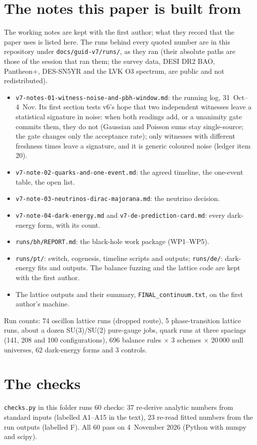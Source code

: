 \documentclass[11pt,a4paper]{article}
\begin{document}
\section{The notes this paper is built from}\label{app:notes}
The working notes are kept with the first author; what they record that the paper uses is listed here. The runs behind every
quoted number are in this repository under \texttt{docs/guid-v7/runs/}, as they ran (their absolute paths are those of the session that ran them;
the survey data, DESI DR2 BAO, Pantheon+, DES-SN5YR and the LVK O3 spectrum, are public and not redistributed).
\begin{itemize}[leftmargin=*,itemsep=1pt]
\item \texttt{v7-notes-01-witness-noise-and-pbh-window.md}: the running log, 31~Oct--4~Nov. Its first section tests v6's hope that two
independent witnesses leave a statistical signature in noise: when both readings add, or a unanimity gate commits them, they do not (Gaussian
and Poisson sums stay single-source; the gate changes only the acceptance rate); only witnesses with different freshness times leave a
signature, and it is generic coloured noise (ledger item 20).
\item \texttt{v7-note-02-quarks-and-one-event.md}: the agreed timeline, the one-event table, the open list.
\item \texttt{v7-note-03-neutrinos-dirac-majorana.md}: the neutrino decision.
\item \texttt{v7-note-04-dark-energy.md} and \texttt{v7-de-prediction-card.md}: every dark-energy form, with its count.
\item \texttt{runs/bh/REPORT.md}: the black-hole work package (WP1--WP5).
\item \texttt{runs/pt/}: switch, cogenesis, timeline scripts and outputs; \texttt{runs/de/}: dark-energy fits and outputs. The balance fuzzing
and the lattice code are kept with the first author.
\item The lattice outputs and their summary, \texttt{FINAL\_continuum.txt}, on the first author's machine.
\end{itemize}
Run counts: 74 oscillon lattice runs (dropped route), 5 phase-transition lattice runs, about a dozen SU(3)/SU(2) pure-gauge jobs, quark runs at three
spacings (141, 208 and 100 configurations), 696 balance rules $\times$ 3 schemes $\times$ 20\,000 null universes, 62 dark-energy forms and 3 controls.

\section{The checks}\label{app:checks}
\texttt{checks.py} in this folder runs 60 checks: 37 re-derive analytic numbers from standard inputs (labelled A1--A15 in the text), 23 re-read
fitted numbers from the run outputs (labelled F). All 60 pass on 4~November 2026 (Python with numpy and scipy).
\end{document}
